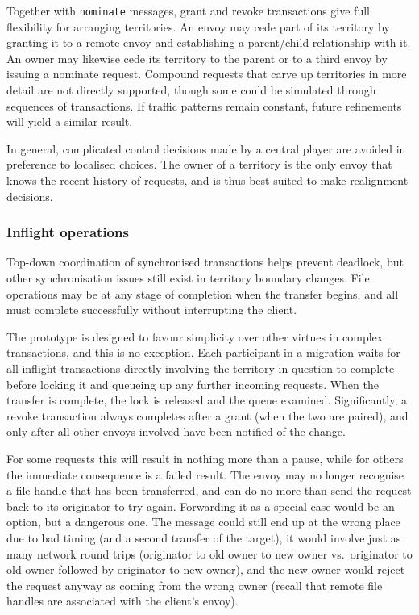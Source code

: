 Together with \texttt{nominate} messages, grant and revoke transactions give full flexibility for arranging territories. An envoy may cede part of its territory by granting it to a remote envoy and establishing a parent/child relationship with it. An owner may likewise cede its territory to the parent or to a third envoy by issuing a nominate request. Compound requests that carve up territories in more detail are not directly supported, though some could be simulated through sequences of transactions. If traffic patterns remain constant, future refinements will yield a similar result.

In general, complicated control decisions made by a central player are avoided in preference to localised choices. The owner of a territory is the only envoy that knows the recent history of requests, and is thus best suited to make realignment decisions.

\subsubsection{Inflight operations}

Top-down coordination of synchronised transactions helps prevent deadlock, but other synchronisation issues still exist in territory boundary changes. File operations may be at any stage of completion when the transfer begins, and all must complete successfully without interrupting the client.

The prototype is designed to favour simplicity over other virtues in complex transactions, and this is no exception. Each participant in a migration waits for all inflight transactions directly involving the territory in question to complete before locking it and queueing up any further incoming requests. When the transfer is complete, the lock is released and the queue examined. Significantly, a revoke transaction always completes after a grant (when the two are paired), and only after all other envoys involved have been notified of the change.

For some requests this will result in nothing more than a pause, while for others the immediate consequence is a failed result. The envoy may no longer recognise a file handle that has been transferred, and can do no more than send the request back to its originator to try again. Forwarding it as a special case would be an option, but a dangerous one. The message could still end up at the wrong place due to bad timing (and a second transfer of the target), it would involve just as many network round trips (originator to old owner to new owner vs.\ originator to old owner followed by originator to new owner), and the new owner would reject the request anyway as coming from the wrong owner (recall that remote file handles are associated with the client's envoy).

